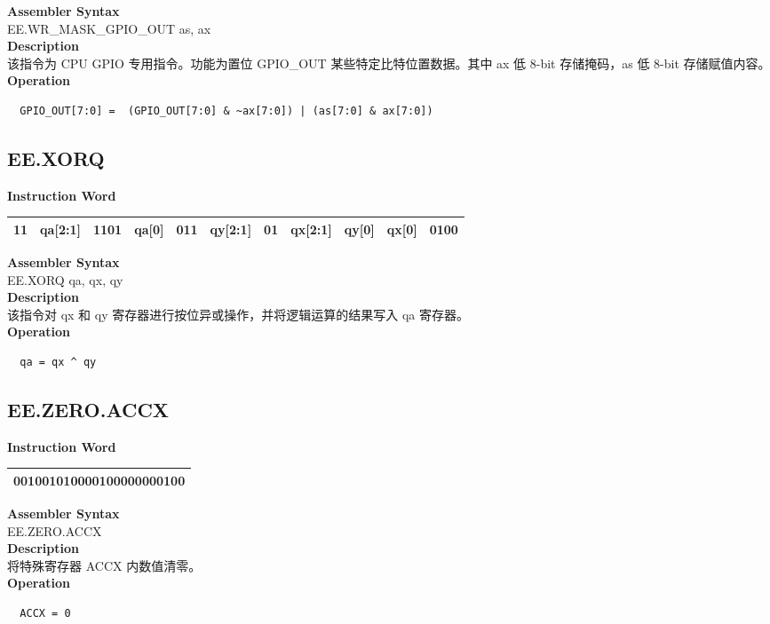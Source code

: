 \textbf{Assembler Syntax} \\
EE.WR\_MASK\_GPIO\_OUT as, ax \\
\textbf{Description} \\
该指令为 CPU GPIO 专用指令。功能为置位 GPIO\_OUT 某些特定比特位置数据。其中 ax 低 8-bit 存储掩码，as 低 8-bit 存储赋值内容。\\
\textbf{Operation}
\begin{lstlisting}
  GPIO_OUT[7:0] =  (GPIO_OUT[7:0] & ~ax[7:0]) | (as[7:0] & ax[7:0])
\end{lstlisting}

\clearpage
\subsection{EE.XORQ}\label{instruction:EEXORQ}
\setlength\tabcolsep{6pt}
\textbf{Instruction Word} \\
\begin{tabular}{|c|c|c|c|c|c|c|c|c|c|c|}
	\hline
	11 & qa[2:1] & 1101 & qa[0] & 011 & qy[2:1] & 01 & qx[2:1] & qy[0] & qx[0] & 0100 \\
	\hline
\end{tabular}

\textbf{Assembler Syntax} \\
EE.XORQ qa, qx, qy \\
\textbf{Description} \\
该指令对 qx 和 qy 寄存器进行按位异或操作，并将逻辑运算的结果写入 qa 寄存器。\\
\textbf{Operation}
\begin{lstlisting}
  qa = qx ^ qy
\end{lstlisting}

\clearpage
\subsection{EE.ZERO.ACCX}\label{instruction:EEZEROACCX}
\setlength\tabcolsep{6pt}
\textbf{Instruction Word} \\
\begin{tabular}{|c|}
	\hline
	001001010000100000000100 \\
	\hline
\end{tabular}

\textbf{Assembler Syntax} \\
EE.ZERO.ACCX  \\
\textbf{Description} \\
将特殊寄存器 ACCX 内数值清零。\\
\textbf{Operation}
\begin{lstlisting}
  ACCX = 0
\end{lstlisting}

